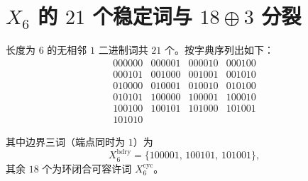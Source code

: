
\section{$X_6$ 的 $21$ 个稳定词与 $18\oplus 3$ 分裂}

长度为 $6$ 的无相邻 $1$ 二进制词共 $21$ 个。按字典序列出如下：
$$
\begin{array}{llll}
000000 & 000001 & 000010 & 000100\\
000101 & 001000 & 001001 & 001010\\
010000 & 010001 & 010010 & 010100\\
010101 & 100000 & 100001 & 100010\\
100100 & 100101 & 101000 & 101001\\
101010 & &
\end{array}
$$

其中边界三词（端点同时为 $1$）为
$$
X_6^{\mathrm{bdry}}=\{100001,\,100101,\,101001\},
$$
其余 $18$ 个为环闭合可容许词 $X_6^{\mathrm{cyc}}$。

